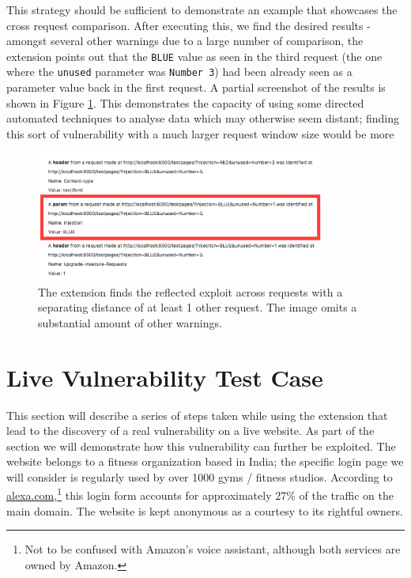 This strategy should be sufficient to demonstrate an example that showcases the cross request comparison. After executing this, we find the desired results - amongst several other warnings due to a large number of comparison, the extension points out that the \texttt{BLUE} value as seen in the third request (the one where the \texttt{unused} parameter was \texttt{Number 3}) had been already seen as a parameter value back in the first request. A partial screenshot of the results is shown in Figure \ref{fig:cross_check_warnings}. This demonstrates the capacity of using some directed automated techniques to analyse data which may otherwise seem distant; finding this sort of vulnerability with a much larger request window size would be more 

\begin{figure}[h!]
	\centering
	\includegraphics[width=0.85\textwidth]{images/cross_request_warnings.png}
	\caption{The extension finds the reflected exploit across requests with a separating distance of at least 1 other request. The image omits a substantial amount of other warnings.}
	\label{fig:cross_check_warnings}
\end{figure}


\section{Live Vulnerability Test Case}

This section will describe a series of steps taken while using the extension that lead to the discovery of a real vulnerability on a live website. As part of the section we will demonstrate how this vulnerability can further be exploited. The website belongs to a fitness organization based in India; the specific login page we will consider is regularly used by over 1000 gyms / fitness studios. According to \url{alexa.com},\footnote{Not to be confused with Amazon's voice assistant, although both services are owned by Amazon.} this login form accounts for approximately 27\% of the traffic on the main domain. The website is kept anonymous as a courtesy to its rightful owners. \\ 

